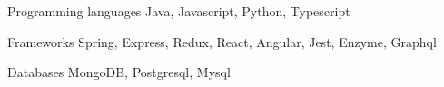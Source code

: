 

\begin{cvskills}

  \cvskill
    {Programming languages} %
    {Java, Javascript, Python, Typescript} %

  \cvskill
    {Frameworks} %
    {Spring, Express, Redux, React, Angular, Jest, Enzyme, Graphql} %


  \cvskill
    {Databases} %
    {MongoDB, Postgresql, Mysql} %

\end{cvskills}
